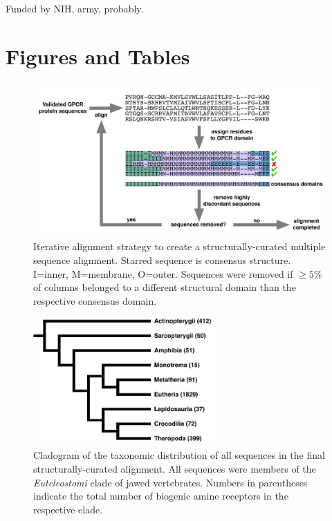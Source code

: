 \documentclass[fleqn,10pt]{wlpeerj}
\begin{document}
Funded by NIH, army, probably.




\newpage


\section*{Figures and Tables}

\vspace{3cm}

\begin{figure}[htbp]
	\centerline{\includegraphics[width=18cm]{figures/alignment_flowchart.pdf}}
	\caption{\label{flowchart} Iterative alignment strategy to create a structurally-curated multiple sequence alignment. Starred sequence is consensus structure. I=inner, M=membrane, O=outer. Sequences were removed if $\geq 5\%$ of columns belonged to a different structural domain than the respective consensus domain.}
\end{figure}


\newpage


\begin{figure}[htbp]
	\centerline{\includegraphics[width=7cm]{figures/taxonomic_distribution.pdf}}
	\caption{\label{taxa_dist} Cladogram of the taxonomic distribution of all sequences in the final structurally-curated alignment. All sequences were members of the \emph{Euteleostomi} clade of jawed vertebrates. Numbers in parentheses indicate the total number of biogenic amine receptors in the respective clade.}
\end{figure}
\end{document}
